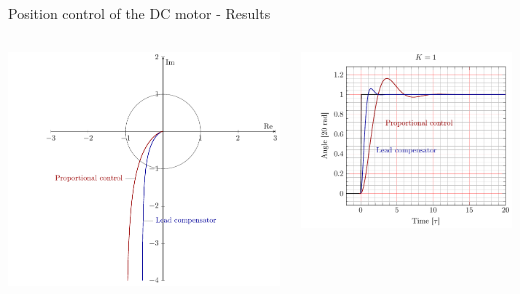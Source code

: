 \documentclass[presentation,aspectratio=169, usenames, dvipsnames]{beamer}
\begin{document}
\begin{frame}[label={sec:org1eddb08}]{Position control of the DC motor - Results}
\begin{columns}
\begin{column}{0.5\columnwidth}
\begin{center}
 \includegraphics[width=\linewidth]{../../figures/nyquist-loop-gain-lead-normalized-DC}
\end{center}
\end{column}

\begin{column}{0.5\columnwidth}
    \begin{center}
  \includegraphics[width=1.0\linewidth]{../../figures/step-response-lead-normalized-DC}
\end{center}
\end{column}
\end{columns}
\end{frame}
\end{document}
